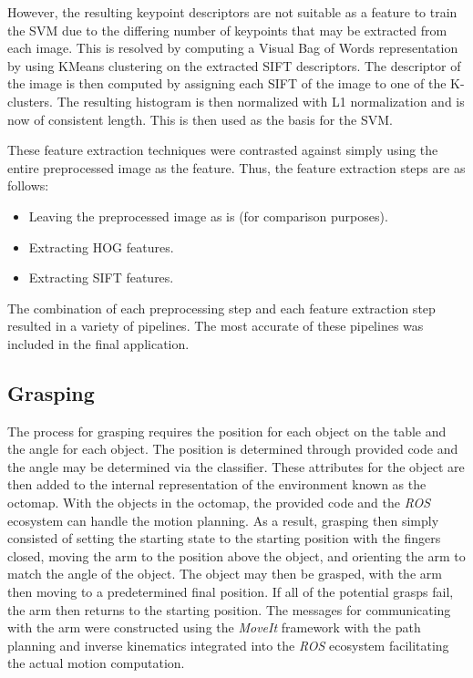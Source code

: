\documentclass[letterpaper, 10 pt, conference]{conf/ieeeconf}  %
\begin{document}
However, the resulting keypoint descriptors are not suitable as a feature to
train the SVM due to the differing number of keypoints that may be extracted
from each image. This is resolved by computing a Visual Bag of Words representation
by using KMeans clustering on the extracted SIFT descriptors. The descriptor of
the image is then computed by assigning each SIFT of the image to one of the
K-clusters. The resulting histogram is then normalized with L1 normalization and
is now of consistent length. This is then used as the basis for the SVM.

These feature extraction techniques were contrasted against simply using the
entire preprocessed image as the feature. Thus, the feature extraction steps are
as follows:
\begin{itemize}
\item Leaving the preprocessed image as is (for comparison purposes).
\item Extracting HOG features.
\item Extracting SIFT features.
\end{itemize}

The combination of each preprocessing step and each feature extraction step
resulted in a variety of pipelines. The most accurate of these pipelines was
included in the final application.

\subsection{Grasping} %
The process for grasping requires the position for each object on the table and
the angle for each object. The position is determined through provided code and
the angle may be determined via the classifier. These attributes for the object
are then added to the internal representation of the environment known as the
octomap. With the objects in the octomap, the provided code and the \textit{ROS}
ecosystem can handle the motion planning. As a result, grasping then simply
consisted of setting the starting state to the starting position with the
fingers closed, moving the arm to the position above the object, and orienting
the arm to match the angle of the object. The object may then be grasped, with
the arm then moving to a predetermined final position. If all of the potential
grasps fail, the arm then returns to the starting position. The messages for
communicating with the arm were constructed using the \textit{MoveIt} framework
with the path planning and inverse kinematics integrated into the \textit{ROS}
ecosystem facilitating the actual motion computation.
\end{document}
